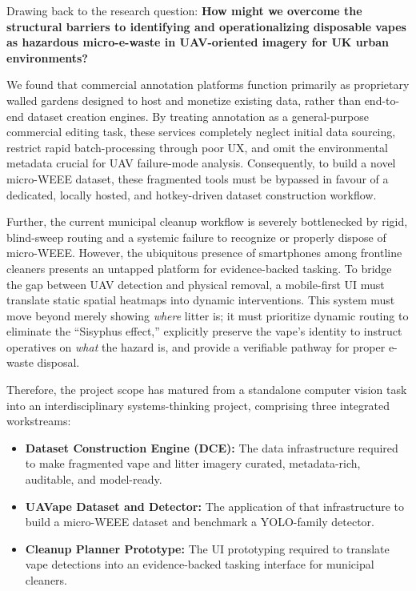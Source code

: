 Drawing back to the research question:
\vspace{0.5em}
\noindent\textbf{How might we overcome the structural barriers to identifying and operationalizing disposable vapes as hazardous micro-e-waste in UAV-oriented imagery for UK urban environments?}

We found that commercial annotation platforms function primarily as proprietary walled gardens designed to host and monetize existing data, rather than end-to-end dataset creation engines. By treating annotation as a general-purpose commercial editing task, these services completely neglect initial data sourcing, restrict rapid batch-processing through poor UX, and omit the environmental metadata crucial for UAV failure-mode analysis. Consequently, to build a novel micro-WEEE dataset, these fragmented tools must be bypassed in favour of a dedicated, locally hosted, and hotkey-driven dataset construction workflow.

Further, the current municipal cleanup workflow is severely bottlenecked by rigid, blind-sweep routing and a systemic failure to recognize or properly dispose of micro-WEEE. However, the ubiquitous presence of smartphones among frontline cleaners presents an untapped platform for evidence-backed tasking. To bridge the gap between UAV detection and physical removal, a mobile-first UI must translate static spatial heatmaps into dynamic interventions. This system must move beyond merely showing \textit{where} litter is; it must prioritize dynamic routing to eliminate the ``Sisyphus effect,'' explicitly preserve the vape's identity to instruct operatives on \textit{what} the hazard is, and provide a verifiable pathway for proper e-waste disposal.

Therefore, the project scope has matured from a standalone computer vision task into an interdisciplinary systems-thinking project, comprising three integrated workstreams:

\begin{itemize}
    \item \textbf{Dataset Construction Engine (DCE):} The data infrastructure required to make fragmented vape and litter imagery curated, metadata-rich, auditable, and model-ready.
    \item \textbf{UAVape Dataset and Detector:} The application of that infrastructure to build a micro-WEEE dataset and benchmark a YOLO-family detector.
    \item \textbf{Cleanup Planner Prototype:} The UI prototyping required to translate vape detections into an evidence-backed tasking interface for municipal cleaners.
\end{itemize}

